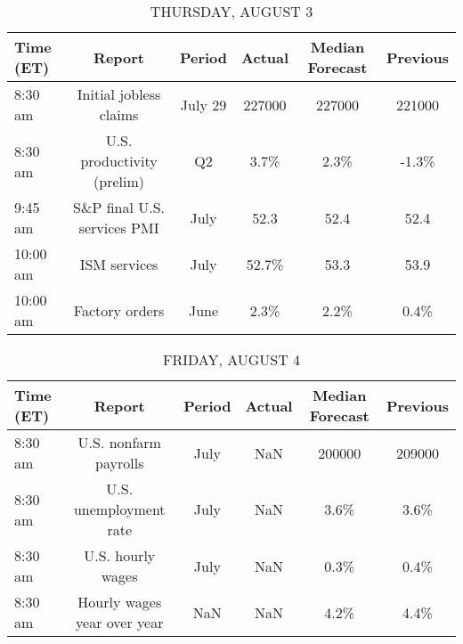 \documentclass{article}%
\begin{document}
%


\begin{table}[htbp]%
\caption{THURSDAY, AUGUST 3}%
\centering%
\begin{adjustbox}{width=1\textwidth}%
\begin{tabular}{lccccc}
\toprule
Time (ET) &                      Report &  Period & Actual & Median Forecast & Previous \\
\midrule
  8:30 am &      Initial jobless claims & July 29 & 227000 &          227000 &   221000 \\
  8:30 am &  U.S. productivity (prelim) &      Q2 &   3.7\% &            2.3\% &    -1.3\% \\
  9:45 am & S\&P final U.S. services PMI &    July &   52.3 &            52.4 &     52.4 \\
 10:00 am &                ISM services &    July &  52.7\% &            53.3 &     53.9 \\
 10:00 am &              Factory orders &    June &   2.3\% &            2.2\% &     0.4\% \\
\bottomrule
\end{tabular}
%
\end{adjustbox}%
\end{table}

%


\begin{table}[htbp]%
\caption{FRIDAY, AUGUST 4}%
\centering%
\begin{adjustbox}{width=1\textwidth}%
\begin{tabular}{lccccc}
\toprule
Time (ET) &                      Report & Period & Actual & Median Forecast & Previous \\
\midrule
  8:30 am &       U.S. nonfarm payrolls &   July &    NaN &          200000 &   209000 \\
  8:30 am &      U.S. unemployment rate &   July &    NaN &            3.6\% &     3.6\% \\
  8:30 am &           U.S. hourly wages &   July &    NaN &            0.3\% &     0.4\% \\
  8:30 am & Hourly wages year over year &    NaN &    NaN &            4.2\% &     4.4\% \\
\bottomrule
\end{tabular}
%
\end{adjustbox}%
\end{table}
\end{document}
